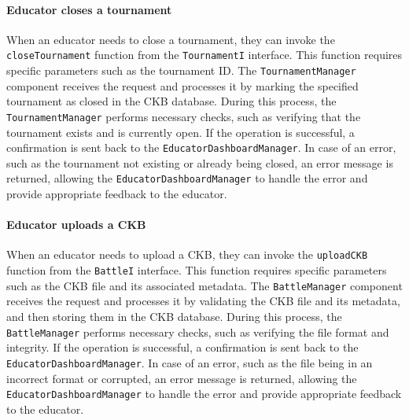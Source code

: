 \paragraph{Educator closes a tournament}
When an educator needs to close a tournament, they can invoke the \verb|closeTournament| function from the \verb|TournamentI| interface. This function requires specific parameters such as the tournament ID. 
The \verb|TournamentManager| component receives the request and processes it by marking the specified tournament as closed in the CKB database. 
During this process, the \verb|TournamentManager| performs necessary checks, such as verifying that the tournament exists and is currently open. If the operation is successful, a confirmation is sent back to the \verb|EducatorDashboardManager|. 
In case of an error, such as the tournament not existing or already being closed, an error message is returned, allowing the \verb|EducatorDashboardManager| to handle the error and provide appropriate feedback to the educator.

\paragraph{Educator uploads a CKB}
When an educator needs to upload a CKB, they can invoke the \verb|uploadCKB| function from the \verb|BattleI| interface. This function requires specific parameters such as the CKB file and its associated metadata. 
The \verb|BattleManager| component receives the request and processes it by validating the CKB file and its metadata, and then storing them in the CKB database. 
During this process, the \verb|BattleManager| performs necessary checks, such as verifying the file format and integrity. If the operation is successful, a confirmation is sent back to the \verb|EducatorDashboardManager|. 
In case of an error, such as the file being in an incorrect format or corrupted, an error message is returned, allowing the \verb|EducatorDashboardManager| to handle the error and provide appropriate feedback to the educator.

